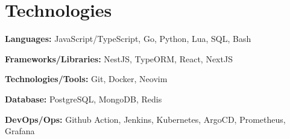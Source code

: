 \section{Technologies}

\begin{onecolentry}
	\textbf{Languages:}
	JavaScript/TypeScript,
	Go,
	Python,
	Lua,
	SQL,
	Bash
\end{onecolentry}

\vspace{0.2 cm}

\begin{onecolentry}
	\textbf{Frameworks/Libraries:}
	NestJS,
	TypeORM,
	React,
	NextJS
\end{onecolentry}

\vspace{0.2 cm}

\begin{onecolentry}
	\textbf{Technologies/Tools:}
	Git,
	Docker,
	Neovim
\end{onecolentry}

\vspace{0.2 cm}

\begin{onecolentry}
	\textbf{Database:}
	PostgreSQL,
	MongoDB,
	Redis
\end{onecolentry}

\vspace{0.2 cm}

\begin{onecolentry}
	\textbf{DevOps/Ops:}
	Github Action,
	Jenkins,
	Kubernetes,
	ArgoCD,
	Prometheus,
	Grafana
\end{onecolentry}

%
%
%

